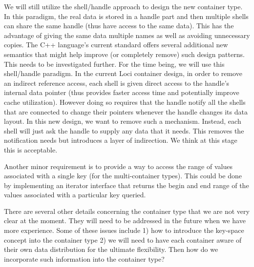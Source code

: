 \documentclass{article}
\begin{document}
We will still utilize the shell/handle approach to design the new
container type.  In this paradigm, the real data is stored in a handle
part and then multiple shells can share the same handle (thus have
access to the same data).  This has the advantage of giving the same
data multiple names as well as avoiding unnecessary copies.  The C++
language's current standard offers several additional new semantics that
might help improve (or completely remove) such design patterns.  This
needs to be investigated further.  For the time being, we will use this
shell/handle paradigm.  In the current Loci container design, in order
to remove an indirect reference access, each shell is given direct
access to the handle's internal data pointer (thus provides faster
access time and potentially improve cache utilization).  However doing
so requires that the handle notify all the shells that are connected to
change their pointers whenever the handle changes its data layout.  In
this new design, we want to remove such a mechanism.  Instead, each
shell will just ask the handle to supply any data that it needs.  This
removes the notification needs but introduces a layer of indirection.
We think at this stage this is acceptable.

Another minor requirement is to provide a way to access the range of
values associated with a single key (for the multi-container types).
This could be done by implementing an iterator interface that returns
the begin and end range of the values associated with a particular key
queried.

There are several other details concerning the container type that we
are not very clear at the moment.  They will need to be addressed in the
future when we have more experience.  Some of these issues include 1)
how to introduce the key-space concept into the container type 2) we
will need to have each container aware of their own data distribution
for the ultimate flexibility.  Then how do we incorporate such
information into the container type?
\end{document}
